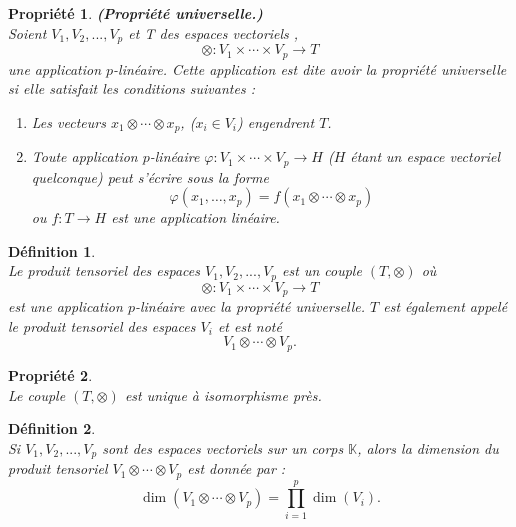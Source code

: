 \documentclass[a4paper, 14pt]{report}
\newtheorem{definition}{Définition}[section]
\newtheorem{propriety}{Propriété}[section]
\begin{document}
\begin{onehalfspace}
{			\begin{propriety}\textbf{(Propriété universelle.)} \cite{greub2012linear}\\
				Soient \( V_1, V_2, ... ,V_p \) et T des espaces vectoriels , 
				\[
				\otimes : V_1 \times \cdots \times V_p \to T
				\]
				une application \( p \)-linéaire. Cette application est dite avoir la \textit{propriété universelle} si elle satisfait les conditions suivantes :
				\begin{enumerate} [label=\roman*)]
					\item Les vecteurs \( x_1 \otimes \cdots \otimes x_p \), (\( x_i \in V_i \)) engendrent \( T \).
					\item Toute application \( p \)-linéaire \( \varphi : V_1 \times \cdots \times V_p \to H \) (\( H \) étant un espace vectoriel quelconque) peut s'écrire sous la forme
					\[
					\varphi(x_1, \ldots, x_p) = f(x_1 \otimes \cdots \otimes x_p)
					\]
					ou \( f : T \to H \) est une application linéaire.
				\end{enumerate}
			\end{propriety}
			
			\begin{definition} \cite{greub2012linear}\\
				Le produit tensoriel des espaces \( V_1, V_2, ... ,V_p \) est un couple \( (T, \otimes) \) où
				\[
				\otimes : V_1 \times \cdots \times V_p \to T
				\]
				est une application \( p \)-linéaire avec la propriété universelle. \( T \) est également appelé le produit tensoriel des espaces \( V_i \) et est noté
				\[
				V_1 \otimes \cdots \otimes V_p.
				\]
			\end{definition}
			
			\begin{propriety} \cite{greub2012linear}\\
				Le couple \( (T, \otimes) \) est unique à isomorphisme près.
			\end{propriety}
			
			
			\begin{definition} \cite{greub2012linear}\\
				Si \( V_1, V_2, ... ,V_p \) sont des espaces vectoriels sur un corps \( \mathbb{K} \), alors la dimension du produit tensoriel \( V_1 \otimes \cdots \otimes V_p \) est donnée par :
				\[
				\dim(V_1 \otimes \cdots \otimes V_p) = \prod_{i=1}^p \dim(V_i).
				\]
			\end{definition}
			
			
			
}
\end{onehalfspace}
\end{document}
